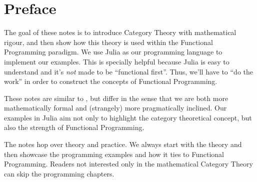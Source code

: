 \newpage
\chapter*{Preface}

The goal of these notes is to introduce Category Theory with mathematical rigour, and then
show how this theory is used within the Functional Programming paradigm.
We use Julia as our programming language to implement our examples. This is specially helpful
because Julia is easy to understand and it's \textit{not} made to be ``functional first''. Thus,
we'll have to ``do the work'' in order to construct the concepts of Functional Programming.

These notes are similar to \citet{milewski2018category}, but differ in the sense that we
are both more mathematically formal and (strangely) more pragmatically inclined.
Our examples in Julia aim not only to highlight the category theoretical concept,
but also the strength of Functional Programming.

The notes hop over theory and practice. We always start with the theory and
then showcase the programming examples and how it ties to Functional Programming.
Readers not interested only in the mathematical Category Theory
can skip the programming chapters.


